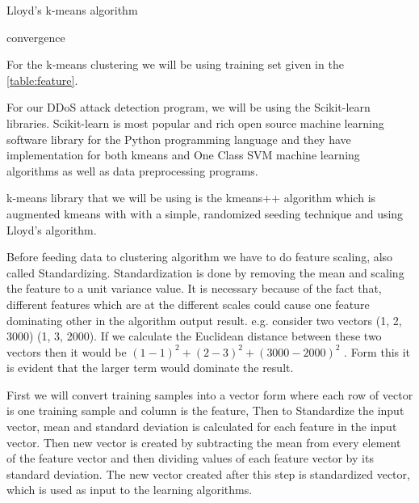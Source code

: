 \documentclass[10pt,oneside,a4paper]{article}
\begin{document}
\begin{algorithm}
\caption{Lloyd's k-means algorithm}\label{kmeans}
\begin{algorithmic}
\Repeat
  \EndFor
  \EndFor
\Until convergence
\end{algorithmic}
\end{algorithm}

For the k-means clustering we will be using training set given in the \ref{table:feature}.

For our DDoS attack detection program, we will be using the Scikit-learn libraries. Scikit-learn is most popular and rich open source machine learning software library for the Python programming language and they have implementation for both kmeans and One Class SVM machine learning algorithms as well as data preprocessing programs.

k-means library that we will be using is the kmeans++ algorithm which is augmented kmeans with with a simple, randomized seeding technique and using Lloyd’s algorithm.

Before feeding data to clustering algorithm we have to do feature scaling, also called Standardizing. Standardization is done by removing the mean and scaling the feature to a unit variance value. It is necessary because of the fact that, different features which are at the different scales could cause one feature dominating other in the algorithm output result. e.g. consider two vectors (1, 2, 3000) (1, 3, 2000). If we calculate the Euclidean distance between these two vectors then it would be $(1-1)^2 + (2-3)^2 + (3000-2000)^2$ . Form this it is evident that the larger term would dominate the result.

First we will convert training samples into a vector form where each row of vector is one training sample and column is the feature, Then to Standardize the input vector, mean and standard deviation is calculated for each feature in the input vector. Then new vector is created by subtracting the mean from every element of the feature vector and then dividing values of each feature vector by its standard deviation. The new vector created after this step is standardized vector, which is used as input to the learning algorithms.
\end{document}
